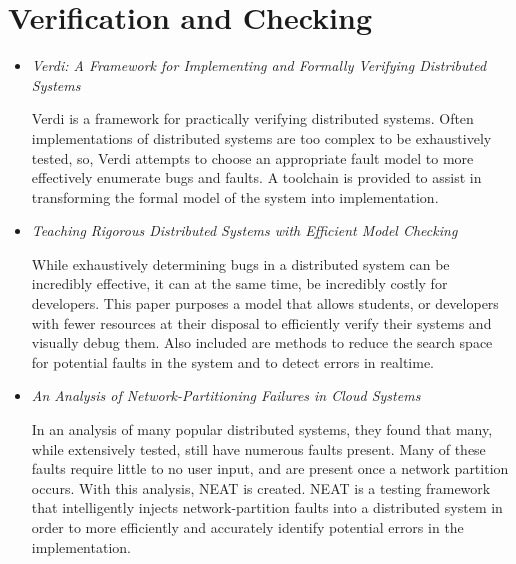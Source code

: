 \documentclass{article}
\begin{document}
\tableofcontents{}

\section{Verification and Checking}

\begin{itemize}

	\subsection{Analysis and Checking Frameworks}
	
	\item
	\textit{Verdi: A Framework for Implementing and Formally Verifying Distributed Systems} \cite{Verdi}

	Verdi is a framework for practically verifying distributed systems. Often implementations of distributed systems are
	too complex to be exhaustively tested, so, Verdi attempts to choose an appropriate fault model to more effectively enumerate bugs and faults.
	A toolchain is provided to assist in transforming the formal model of the system into implementation.

	\item
	\textit{Teaching Rigorous Distributed Systems with Efficient Model Checking} \cite{MichaelWAET2019}

	While exhaustively determining bugs in a distributed system can be incredibly effective, it can at the same time, be incredibly costly for developers.
	This paper purposes a model that allows students, or developers with fewer resources at their disposal to efficiently verify their systems and visually debug them.
	Also included are methods to reduce the search space for potential faults in the system and to detect errors in realtime.

	\item
	\textit{An Analysis of Network-Partitioning Failures in Cloud Systems} \cite{NEAT}

	In an analysis of many popular distributed systems, they found that many, while extensively tested, still have numerous faults present.
	Many of these faults require little to no user input, and are present once a network partition occurs. With this analysis, NEAT is created.
	NEAT is a testing framework that intelligently injects network-partition faults into a distributed system in order to more efficiently and accurately identify potential errors in the implementation.


\end{itemize}
\end{document}

